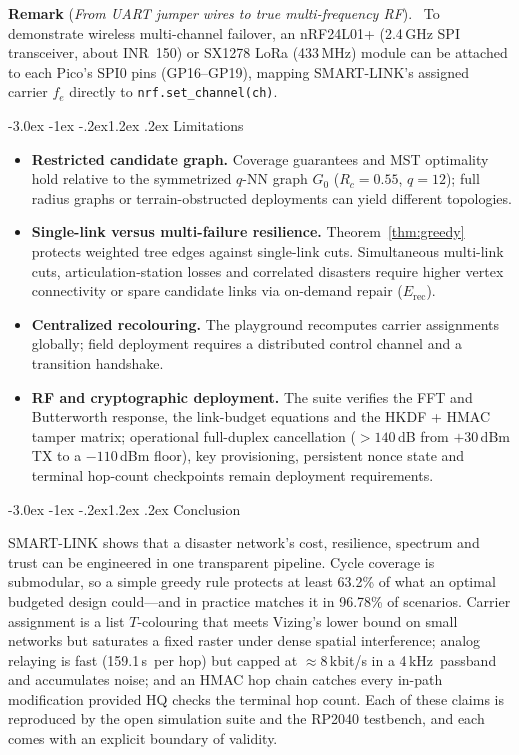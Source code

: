 \documentclass[10pt,a4paper]{article}
\makeatletter
\renewcommand\section{\@startsection{section}{1}{\z@}%
  {-3.0ex \@plus -1ex \@minus -.2ex}{1.2ex \@plus .2ex}%
  {\normalfont\large\bfseries}}
\newenvironment{keybox}[1]{\par\smallskip\noindent\textbf{Remark} (\textit{#1}).\ \ignorespaces}{\par\smallskip}
\newcommand\kHz{\,kHz}
\newcommand\us{\,\textmu s}
\makeatother
\begin{document}
\begin{keybox}{From UART jumper wires to true multi-frequency RF}
To demonstrate wireless multi-channel failover, an nRF24L01+ (2.4\,GHz SPI transceiver, about INR~150) or SX1278 LoRa (433\,MHz)
module can be attached to each Pico's SPI0 pins (GP16--GP19), mapping SMART-LINK's assigned carrier $f_e$ directly to
\texttt{nrf.set\_channel(ch)}.
\end{keybox}

\section{Limitations}\label{sec:limits}

\begin{itemize}\setlength\itemsep{1pt}
  \item \textbf{Restricted candidate graph.} Coverage guarantees and MST optimality hold relative to the symmetrized $q$-NN graph
        $G_0$ ($R_c=0.55$, $q=12$); full radius graphs or terrain-obstructed deployments can yield different topologies.
  \item \textbf{Single-link versus multi-failure resilience.} Theorem~\ref{thm:greedy} protects weighted tree edges against single-link
        cuts. Simultaneous multi-link cuts, articulation-station losses and correlated disasters require higher vertex
        connectivity or spare candidate links via on-demand repair ($E_\text{rec}$).
  \item \textbf{Centralized recolouring.} The playground recomputes carrier assignments globally; field deployment requires a
        distributed control channel and a transition handshake.
  \item \textbf{RF and cryptographic deployment.} The suite verifies the FFT and Butterworth response, the link-budget equations
        and the HKDF + HMAC tamper matrix; operational full-duplex cancellation ($>140$\,dB from $+30$\,dBm TX to a $-110$\,dBm
        floor), key provisioning, persistent nonce state and terminal hop-count checkpoints remain deployment requirements.
\end{itemize}

\section{Conclusion}\label{sec:conclusion}

SMART-LINK shows that a disaster network's cost, resilience, spectrum and trust can be engineered in one transparent
pipeline. Cycle coverage is submodular, so a simple greedy rule protects at least 63.2\% of what an optimal budgeted design
could---and in practice matches it in 96.78\% of scenarios. Carrier assignment is a list $T$-colouring that meets Vizing's
lower bound on small networks but saturates a fixed raster under dense spatial interference; analog relaying is fast
(159.1\us\ per hop) but capped at $\approx$8\,kbit/s in a 4\kHz\ passband and accumulates noise; and an HMAC hop chain catches
every in-path modification provided HQ checks the terminal hop count. Each of these claims is reproduced by the open
simulation suite and the RP2040 testbench, and each comes with an explicit boundary of validity.
\end{document}
